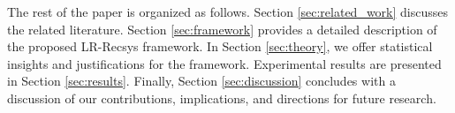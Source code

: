 
The rest of the paper is organized as follows. Section \ref{sec:related_work} discusses the related literature. Section \ref{sec:framework} provides a detailed description of the proposed LR-Recsys framework. In Section \ref{sec:theory}, we offer statistical insights and justifications for the framework. Experimental results are presented in Section \ref{sec:results}. Finally, Section \ref{sec:discussion} concludes with a discussion of our contributions, implications, and directions for future research.









